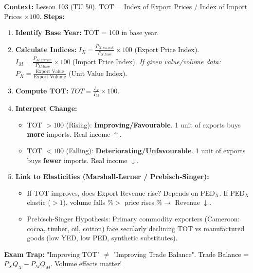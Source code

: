 \documentclass[11pt]{article}
\begin{document}
\begin{methode}
\textbf{Context:} Lesson 103 (TU 50). TOT = Index of Export Prices / Index of Import Prices $\times 100$.
\textbf{Steps:}
\begin{enumerate}
    \item \textbf{Identify Base Year:} TOT = 100 in base year.
    \item \textbf{Calculate Indices:}
        $I_X = \frac{P_{X,\text{current}}}{P_{X,\text{base}}} \times 100$ (Export Price Index).
        $I_M = \frac{P_{M,\text{current}}}{P_{M,\text{base}}} \times 100$ (Import Price Index).
        \textit{If given value/volume data:} $P_X = \frac{\text{Export Value}}{\text{Export Volume}}$ (Unit Value Index).
    \item \textbf{Compute TOT:} $TOT = \frac{I_X}{I_M} \times 100$.
    \item \textbf{Interpret Change:}
        \begin{itemize}
            \item TOT $> 100$ (Rising): \textbf{Improving/Favourable}. 1 unit of exports buys \textbf{more} imports. Real income $\uparrow$.
            \item TOT $< 100$ (Falling): \textbf{Deteriorating/Unfavourable}. 1 unit of exports buys \textbf{fewer} imports. Real income $\downarrow$.
        \end{itemize}
    \item \textbf{Link to Elasticities (Marshall-Lerner / Prebisch-Singer):}
        \begin{itemize}
            \item If TOT improves, does Export Revenue rise? Depends on PED$_X$. If PED$_X$ elastic ($>1$), volume falls $\% >$ price rises $\% \rightarrow$ Revenue $\downarrow$.
            \item Prebisch-Singer Hypothesis: Primary commodity exporters (Cameroon: cocoa, timber, oil, cotton) face secularly declining TOT vs manufactured goods (low YED, low PED, synthetic substitutes).
        \end{itemize}
\end{enumerate}
\textbf{Exam Trap:} "Improving TOT" $\neq$ "Improving Trade Balance". Trade Balance = $P_X Q_X - P_M Q_M$. Volume effects matter!
\end{methode}
\end{document}
